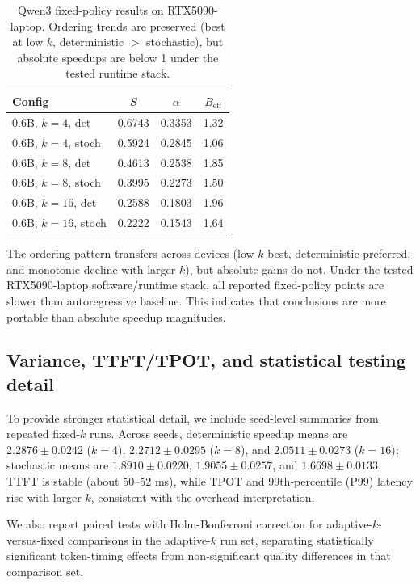 \begin{table}[t]
\centering
\caption{Qwen3 fixed-policy results on RTX5090-laptop.
Ordering trends are preserved (best at low $k$, deterministic $>$ stochastic),
but absolute speedups are below 1 under the tested runtime stack.}
\label{tab:headline-5090}
\small
\begin{tabular}{l c c c}
\hline
\textbf{Config} & $S$ & $\alpha$ & $B_{\text{eff}}$ \\
\hline
0.6B, $k{=}4$, det   & 0.6743 & 0.3353 & 1.32 \\
0.6B, $k{=}4$, stoch & 0.5924 & 0.2845 & 1.06 \\
0.6B, $k{=}8$, det   & 0.4613 & 0.2538 & 1.85 \\
0.6B, $k{=}8$, stoch & 0.3995 & 0.2273 & 1.50 \\
0.6B, $k{=}16$, det  & 0.2588 & 0.1803 & 1.96 \\
0.6B, $k{=}16$, stoch& 0.2222 & 0.1543 & 1.64 \\
\hline
\end{tabular}
\end{table}

The ordering pattern transfers across devices (low-$k$ best,
deterministic preferred, and monotonic decline with larger $k$),
but absolute gains do not.
Under the tested RTX5090-laptop software/runtime stack, all reported
fixed-policy points are slower than autoregressive baseline.
This indicates that
conclusions are more portable than absolute speedup magnitudes.

\subsection{Variance, TTFT/TPOT, and statistical testing detail}

To provide stronger statistical detail, we include seed-level summaries from
repeated fixed-$k$ runs.
Across seeds, deterministic speedup means are
$2.2876\pm0.0242$ ($k{=}4$), $2.2712\pm0.0295$ ($k{=}8$), and
$2.0511\pm0.0273$ ($k{=}16$); stochastic means are
$1.8910\pm0.0220$, $1.9055\pm0.0257$, and $1.6698\pm0.0133$.
TTFT is stable (about 50--52 ms), while TPOT and 99th-percentile (P99)
latency rise with larger
$k$, consistent with the overhead interpretation.

We also report paired tests with Holm-Bonferroni correction for adaptive-$k$-versus-fixed
comparisons in the adaptive-$k$ run set, separating statistically
significant token-timing effects from non-significant quality differences in
that comparison set.


